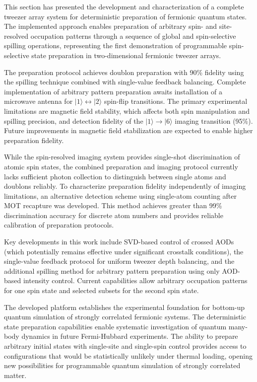 
This section has presented the development and characterization of a complete tweezer array system for deterministic preparation of fermionic quantum states. The implemented approach enables preparation of arbitrary spin- and site-resolved occupation patterns through a sequence of global and spin-selective spilling operations, representing the first demonstration of programmable spin-selective state preparation in two-dimensional fermionic tweezer arrays.

The preparation protocol achieves doublon preparation with 90\% fidelity using the spilling technique combined with single-value feedback balancing. Complete implementation of arbitrary pattern preparation awaits installation of a microwave antenna for $|1\rangle \leftrightarrow |2\rangle$ spin-flip transitions. The primary experimental limitations are magnetic field stability, which affects both spin manipulation and spilling precision, and detection fidelity of the $|1\rangle \to |6\rangle$ imaging transition (95\%). Future improvements in magnetic field stabilization are expected to enable higher preparation fidelity.

While the spin-resolved imaging system provides single-shot discrimination of atomic spin states, the combined preparation and imaging protocol currently lacks sufficient photon collection to distinguish between single atoms and doublons reliably. To characterize preparation fidelity independently of imaging limitations, an alternative detection scheme using single-atom counting after MOT recapture was developed. This method achieves greater than 99\% discrimination accuracy for discrete atom numbers and provides reliable calibration of preparation protocols.

Key developments in this work include SVD-based control of crossed AODs (which potentially remains effective under significant crosstalk conditions), the single-value feedback protocol for uniform tweezer depth balancing, and the additional spilling method for arbitrary pattern preparation using only AOD-based intensity control. Current capabilities allow arbitrary occupation patterns for one spin state and selected subsets for the second spin state.

The developed platform establishes the experimental foundation for bottom-up quantum simulation of strongly correlated fermionic systems. The deterministic state preparation capabilities enable systematic investigation of quantum many-body dynamics in future Fermi-Hubbard experiments. The ability to prepare arbitrary initial states with single-site and single-spin control provides access to configurations that would be statistically unlikely under thermal loading, opening new possibilities for programmable quantum simulation of strongly correlated matter.

